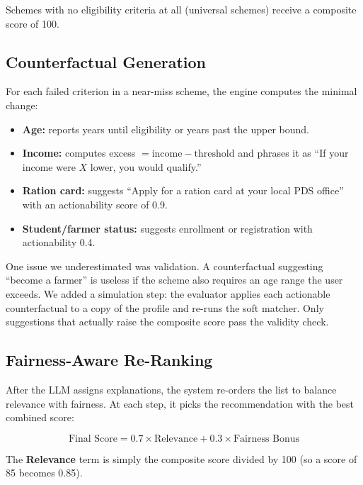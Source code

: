 \documentclass[conference]{IEEEtran}
\newcommand{\rupee}{\textrm{\textup{\text{\textrm{Rs.}}}}}
\begin{document}
Schemes with no eligibility criteria at all (universal schemes) receive a composite score of 100.

\subsection{Counterfactual Generation}

For each failed criterion in a near-miss scheme, the engine computes the minimal change:

\begin{itemize}
    \item \textbf{Age:} reports years until eligibility or years past the upper bound.
    \item \textbf{Income:} computes excess $= \text{income} - \text{threshold}$ and phrases it as ``If your income were \rupee$X$ lower, you would qualify.''
    \item \textbf{Ration card:} suggests ``Apply for a ration card at your local PDS office'' with an actionability score of 0.9.
    \item \textbf{Student/farmer status:} suggests enrollment or registration with actionability 0.4.
\end{itemize}

One issue we underestimated was validation. A counterfactual suggesting ``become a farmer'' is useless if the scheme also requires an age range the user exceeds. We added a simulation step: the evaluator applies each actionable counterfactual to a copy of the profile and re-runs the soft matcher. Only suggestions that actually raise the composite score pass the validity check.

\subsection{Fairness-Aware Re-Ranking}

After the LLM assigns explanations, the system re-orders the list to balance relevance with fairness. At each step, it picks the recommendation with the best combined score:

\begin{equation}
\text{Final Score} = 0.7 \times \text{Relevance} + 0.3 \times \text{Fairness Bonus}
\label{eq:mmr}
\end{equation}

The \textbf{Relevance} term is simply the composite score divided by 100 (so a score of 85 becomes 0.85).
\end{document}
